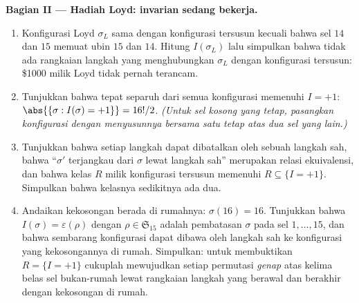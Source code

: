 \begin{problem}
\medskip
\noindent\textbf{Bagian II --- Hadiah Loyd: invarian sedang
bekerja.}
\begin{enumerate}[resume]
  \item Konfigurasi Loyd $\sigma_L$ sama dengan konfigurasi tersusun
        kecuali bahwa sel $14$ dan $15$ memuat ubin $15$ dan $14$.
        Hitung $I(\sigma_L)$ lalu simpulkan bahwa tidak ada rangkaian
        langkah yang menghubungkan $\sigma_L$ dengan konfigurasi
        tersusun: \$1000 milik Loyd tidak pernah terancam.
  \item Tunjukkan bahwa tepat separuh dari semua konfigurasi memenuhi
        $I = +1$: $\abs{\{\sigma : I(\sigma) = +1\}} = 16!/2$.
        \emph{(Untuk sel kosong yang tetap, pasangkan konfigurasi
        dengan menyusunnya bersama satu  tetap atas dua sel
        yang lain.)}
  \item Tunjukkan bahwa setiap langkah dapat dibatalkan oleh sebuah
        langkah sah, bahwa ``$\sigma'$ terjangkau dari $\sigma$ lewat
        langkah sah'' merupakan relasi ekuivalensi, dan bahwa kelas $R$
        milik konfigurasi tersusun memenuhi $R \subseteq \{I = +1\}$.
        Simpulkan bahwa kelasnya sedikitnya ada dua.
  \item Andaikan kekosongan berada di rumahnya: $\sigma(16) = 16$.
        Tunjukkan bahwa $I(\sigma) = \varepsilon(\rho)$ dengan $\rho \in
        \mathfrak{S}_{15}$ adalah pembatasan $\sigma$ pada
        sel $1, \dots, 15$, dan bahwa sembarang konfigurasi dapat
        dibawa oleh langkah sah ke konfigurasi yang kekosongannya di
        rumah. Simpulkan: untuk membuktikan $R = \{I = +1\}$ cukuplah
        mewujudkan setiap permutasi \emph{genap} atas kelima belas sel
        bukan-rumah lewat rangkaian langkah yang berawal dan berakhir
        dengan kekosongan di rumah.
\end{enumerate}


\end{problem}

